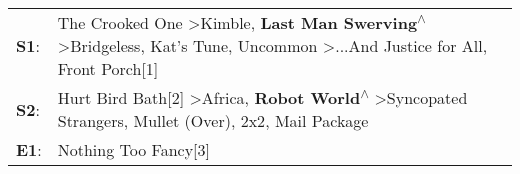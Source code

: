 \begin{supertabular}{p{0.03\textwidth}p{0.92\textwidth}}
 \textbf{S1}:  &  The Crooked One\textsuperscript{} \textgreater \enspace Kimble\textsuperscript{}, \enspace \textbf{Last Man Swerving\textsuperscript{$\wedge$}} \textgreater \enspace Bridgeless\textsuperscript{}, \enspace Kat's Tune\textsuperscript{}, \enspace Uncommon\textsuperscript{} \textgreater \enspace ...And Justice for All\textsuperscript{}, \enspace Front Porch[1]\textsuperscript{}  \enspace  \\
 \textbf{S2}:  &                                                               Hurt Bird Bath[2]\textsuperscript{} \textgreater \enspace Africa\textsuperscript{}, \enspace \textbf{Robot World\textsuperscript{$\wedge$}} \textgreater \enspace Syncopated Strangers\textsuperscript{}, \enspace Mullet (Over)\textsuperscript{}, \enspace 2x2\textsuperscript{}, \enspace Mail Package\textsuperscript{}  \enspace  \\
 \textbf{E1}:  &                                                                                                                                                                                                                                                                                                                                                    Nothing Too Fancy[3]\textsuperscript{}  \enspace  \\
\end{supertabular}
